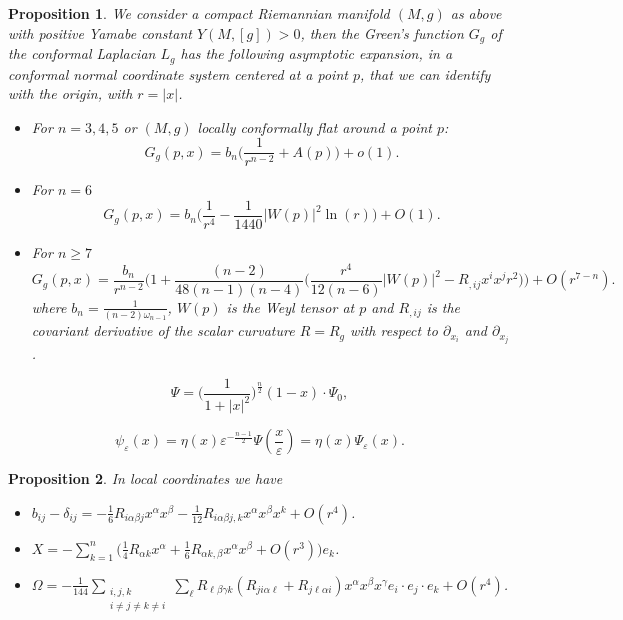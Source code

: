 \documentclass[10pt,a4paper]{amsart}
\newtheorem{proposition}{Proposition}
\begin{document}
\begin{proposition}\label{propgreen}
We consider a compact Riemannian manifold $(M,g)$ as above with positive Yamabe constant $Y(M,[g])>0$, then the Green's function $G_{g}$ of the conformal Laplacian $L_{g}$ has the following asymptotic expansion, in a conformal normal coordinate system centered at a point $p$, that we can identify with the origin, with $r=|x|$.
\begin{itemize}
\item[i)] For $n=3,4,5$ or $(M,g)$ locally conformally flat around a point $p$: %
$$G_{g}(p,x)=b_{n}\Big(\frac{1}{r^{n-2}}+A(p)\Big)+o(1).$$
\item[ii)] For $n=6$
$$G_{g}(p,x)=b_{n}\Big(\frac{1}{r^{4}}-\frac{1}{1440}|W(p)|^{2}\ln(r)\Big)+O(1).$$
\item[iii)] For $n\geq 7$
$$G_{g}(p,x)=\frac{b_{n}}{r^{n-2}}\Big(1+\frac{(n-2)}{48(n-1)(n-4)}\Big(\frac{r^{4}}{12(n-6)}|W(p)|^{2}-R_{,ij}x^{i}x^{j}r^{2}\Big)\Big)+O(r^{7-n}).$$
where $b_{n}=\frac{1}{(n-2)\omega_{n-1}}$, $W(p)$ is the Weyl tensor at $p$ and $R_{,ij}$ is the covariant derivative of the scalar curvature $R=R_g$ with respect to $\partial_{x_{i}}$ and $\partial_{x_{j}}$.
\end{itemize}
\end{proposition}

\begin{equation}\label{psi}
\Psi=\Big(\frac{1}{1+|x|^{2}}\Big)^{\frac{n}{2}}(1-x)\cdot \Psi_{0},
\end{equation}

\begin{equation}\label{psiepsilon}
\psi_{\varepsilon}(x)=\eta(x)\varepsilon^{-\frac{n-1}{2}}\Psi\left(\frac{x}{\varepsilon}\right)=\eta(x) \Psi_{\varepsilon}(x).
\end{equation}

\begin{proposition}\label{propest1}
In local coordinates we have
\begin{itemize}
\item[i)] $b_{ij}-\delta_{ij}=-\frac{1}{6}R_{i\alpha\beta j}x^{\alpha}x^{\beta}-\frac{1}{12}R_{i\alpha\beta j,k}x^{\alpha}x^{\beta}x^{k}+O(r^{4})$.
\item[ii)] $X=-\sum\limits_{k=1}^{n}\Big(\frac{1}{4}R_{\alpha k}x^{\alpha}+\frac{1}{6}R_{\alpha k,\beta}x^{\alpha}x^{\beta}+O(r^{3})\Big)e_{k}$.
\item[iii)] $\Omega=-\frac{1}{144}\sum\limits_{\begin{array}{cc}
i,j,k\\
 i\not=j\not=k\not=i
\end{array}}\sum\limits_{\ell}R_{\ell \beta \gamma k}(R_{ji\alpha\ell}+R_{j\ell\alpha i})x^{\alpha}x^{\beta}x^{\gamma}e_{i}\cdot e_{j}\cdot e_{k}+O(r^{4})$.
\end{itemize}
\end{proposition}
\end{document}
